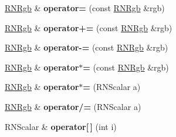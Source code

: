 \begin{DoxyCompactItemize}
\item 
\hyperlink{class_r_n_rgb}{R\+N\+Rgb} \& {\bfseries operator=} (const \hyperlink{class_r_n_rgb}{R\+N\+Rgb} \&rgb)\hypertarget{class_r_n_rgb_a88bf5a135b36186a80dd9375149e2e51}{}\label{class_r_n_rgb_a88bf5a135b36186a80dd9375149e2e51}

\item 
\hyperlink{class_r_n_rgb}{R\+N\+Rgb} \& {\bfseries operator+=} (const \hyperlink{class_r_n_rgb}{R\+N\+Rgb} \&rgb)\hypertarget{class_r_n_rgb_aeaeb41df336a6b06989ff6fce7338233}{}\label{class_r_n_rgb_aeaeb41df336a6b06989ff6fce7338233}

\item 
\hyperlink{class_r_n_rgb}{R\+N\+Rgb} \& {\bfseries operator-\/=} (const \hyperlink{class_r_n_rgb}{R\+N\+Rgb} \&rgb)\hypertarget{class_r_n_rgb_aa1e891799a72d28ea2295f14c4df96cf}{}\label{class_r_n_rgb_aa1e891799a72d28ea2295f14c4df96cf}

\item 
\hyperlink{class_r_n_rgb}{R\+N\+Rgb} \& {\bfseries operator$\ast$=} (const \hyperlink{class_r_n_rgb}{R\+N\+Rgb} \&rgb)\hypertarget{class_r_n_rgb_a894689cd471c191f342a41bbca425157}{}\label{class_r_n_rgb_a894689cd471c191f342a41bbca425157}

\item 
\hyperlink{class_r_n_rgb}{R\+N\+Rgb} \& {\bfseries operator$\ast$=} (R\+N\+Scalar a)\hypertarget{class_r_n_rgb_aa147ab4f2f5312040b5f39a4280e5b07}{}\label{class_r_n_rgb_aa147ab4f2f5312040b5f39a4280e5b07}

\item 
\hyperlink{class_r_n_rgb}{R\+N\+Rgb} \& {\bfseries operator/=} (R\+N\+Scalar a)\hypertarget{class_r_n_rgb_a4f09198f29b895cc56b92d7aa8fccc02}{}\label{class_r_n_rgb_a4f09198f29b895cc56b92d7aa8fccc02}

\item 
R\+N\+Scalar \& {\bfseries operator\mbox{[}$\,$\mbox{]}} (int i)\hypertarget{class_r_n_rgb_ab2bd6c2b98c47f20aeb6ecd11ce21314}{}\label{class_r_n_rgb_ab2bd6c2b98c47f20aeb6ecd11ce21314}

\end{DoxyCompactItemize}
